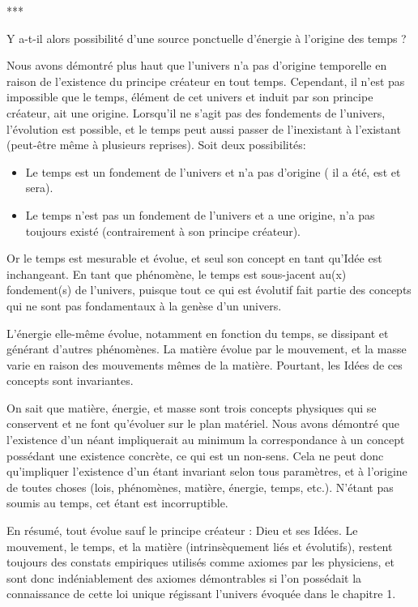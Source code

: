 \begin{center}
***
\end{center}

Y a-t-il alors possibilité d’une source ponctuelle d’énergie à l’origine des temps ?

Nous avons démontré plus haut que l’univers n’a pas d’origine temporelle en raison de l'existence du principe créateur en tout temps. Cependant, il n’est pas impossible que le temps, élément de cet univers et induit par son principe créateur, ait une origine. Lorsqu’il ne s’agit pas des fondements de l’univers, l’évolution est possible, et le temps peut aussi passer de l’inexistant à l’existant (peut-être même à plusieurs reprises).
Soit deux possibilités:

\begin{itemize}
\item Le temps est un fondement de l’univers et n’a pas d’origine ( il a été, est et sera).
\item Le temps n’est pas un fondement de l’univers et a une origine, n’a pas toujours existé (contrairement à son principe créateur). 
\end{itemize}

Or le temps est mesurable et évolue, et seul son concept en tant qu’Idée est inchangeant. En tant que phénomène, le temps est sous-jacent au(x) fondement(s) de l’univers, puisque tout ce qui est évolutif fait partie des concepts qui ne sont pas fondamentaux à la genèse d’un univers.

L’énergie elle-même évolue, notamment en fonction du temps, se dissipant et générant d’autres phénomènes. La matière évolue par le mouvement, et la masse varie en raison des mouvements mêmes de la matière. Pourtant, les Idées de ces concepts sont invariantes.

On sait que matière, énergie, et masse sont trois concepts physiques qui se conservent et ne font qu’évoluer sur le plan matériel. Nous avons démontré que l’existence d’un néant impliquerait au minimum la correspondance à un concept possédant une existence concrète, ce qui est un non-sens. Cela ne peut donc qu’impliquer l’existence d’un étant invariant selon tous paramètres, et à l’origine de toutes choses (lois, phénomènes, matière, énergie, temps, etc.). N’étant pas soumis au temps, cet étant est incorruptible.

En résumé, tout évolue sauf le principe créateur : Dieu et ses Idées. Le mouvement, le temps, et la matière (intrinsèquement liés et évolutifs), restent toujours des constats empiriques utilisés comme axiomes par les physiciens, et sont donc indéniablement des axiomes démontrables si l'on possédait la connaissance de cette loi unique régissant l'univers évoquée dans le chapitre 1.

